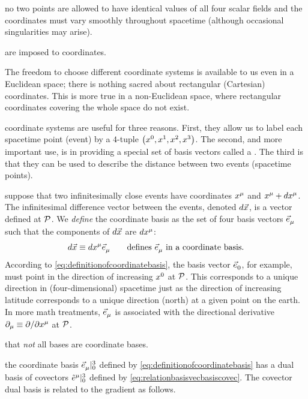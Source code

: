  no two points are allowed to have identical values of all four scalar fields and the coordinates must vary smoothly throughout spacetime (although occasional singularities may arise).

 are imposed to coordinates.

 The freedom to choose different coordinate systems is available to us even in a Euclidean space; there is nothing sacred about rectangular (Cartesian) coordinates. This is more true in a non-Euclidean space, where rectangular coordinates covering the whole space do not exist.

 coordinate systems are useful for three reasons. First, they allow us to label each spacetime point (event) by a $4$-tuple $\tuple{\tvec\pos 0, \tvec\pos 1, \tvec\pos 2, \tvec\pos 3}$. The second, and more important use, is in providing a special set of basis vectors called a . The third is that they can be used to describe the distance between two events (spacetime points).

 suppose that two infinitesimally close events have coordinates $\tvec\pos\mu$ and $\tvec\pos\mu + d\tvec\pos\mu$. The infinitesimal difference vector between the events, denoted $d\vec{x}$, is a vector defined at $\mathcal{P}$. We \emph{define} the coordinate basis as the set of four basis vectors $\tbvec\mu$ such that the components of $d\vec{x}$ are $d\tvec\pos\mu$:
%
\begin{equation}\label{eq:definitionofcoordinatebasis}
  d\vec\pos \defas d\tvec\pos\mu\tbvec\mu\qquad\text{defines $\tbvec\mu$ in a coordinate basis}.
\end{equation}
%
 According to \cref{eq:definitionofcoordinatebasis}, the basis vector $\tbvec 0$, for example, must point in the direction of increasing $\tvec\pos 0$ at $\mathcal{P}$. This corresponds to a unique direction in (four-dimensional) spacetime just as the direction of increasing latitude corresponds to a unique direction (north) at a given point on the earth. In more math treatments, $\tbvec\mu$ is associated with the directional derivative $\ipd\mu\defas\partial/\partial\tvec\pos\mu$ at $\mathcal{P}$.

 that \emph{not} all bases are coordinate bases.

 the coordinate basis $\bset{\tbvec\mu}{0}{3}$ defined by \cref{eq:definitionofcoordinatebasis} has a dual basis of covectors $\bset{\tbcov\mu}{0}{3}$ defined by \cref{eq:relationbasisvecbasiscovec}. The covector dual basis is related to the gradient as follows.

